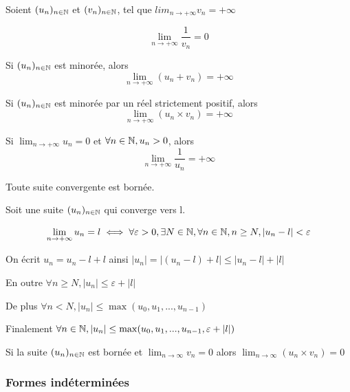\documentclass[a4paper, 12pt]{article}
\begin{document}


\begin{proprietes}
    Soient $(u_n)_{n \in \mathbb{N}}$ et $(v_n)_{n \in \mathbb{N}}$, tel que $lim_{n \to +\infty}v_n = +\infty$
    
    \item $$
    \lim_{n \to +\infty}\frac{1}{v_n} = 0
    $$

    \item Si $(u_n)_{n \in \mathbb{N}}$ est minorée, alors
    $$
    \lim_{n \to +\infty}(u_n + v_n) = +\infty
    $$

    \item Si $(u_n)_{n \in \mathbb{N}}$ est minorée par un réel strictement positif, alors
    $$
    \lim_{n \to +\infty}(u_n \times v_n) = +\infty
    $$

    \item Si $\lim_{n \to +\infty} u_n = 0$ et $\forall n \in \mathbb{N}, u_n > 0$, alors
    $$
    \lim_{n \to +\infty}\frac{1}{u_n} = +\infty
    $$
\end{proprietes}

\begin{theorem}
    Toute suite convergente est bornée.
\end{theorem}

\begin{demonstration}
    Soit une suite $(u_n)_{n \in \mathbb{N}}$ qui converge vers l.

    $$
    \lim_{n \to +\infty}u_n = l \iff \forall \varepsilon > 0, \exists N \in \mathbb{N}, \forall n \in \mathbb{N}, n \geq N, |u_n - l| < \varepsilon
    $$

    On écrit $u_n = u_n - l + l$ ainsi $|u_n| = |(u_n - l) + l| \leq |u_n - l| + |l|$

    En outre $\forall n \geq N, |u_n| \leq \varepsilon + |l|$

    De plus $\forall n \lt N, |u_n| \leq \max(u_0, u_1, ..., u_{n-1})$

    \begin{rdem}
        Finalement $\forall n \in \mathbb{N}, |u_n| \leq \max(u_0, u_1, ..., u_{n-1}, \varepsilon + |l|)$
    \end{rdem}
\end{demonstration}

\begin{corollaire}
    Si la suite $(u_n)_{n \in \mathbb{N}}$ est bornée et $\lim_{n \to \infty} v_n = 0$ alors $\lim_{n \to \infty} (u_n \times v_n) = 0$
\end{corollaire}

\subsubsection{Formes indéterminées}
\end{document}
